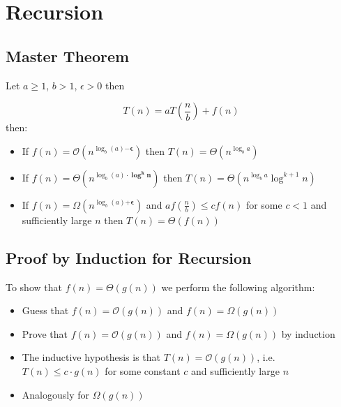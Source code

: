 \section{Recursion}
\subsection{Master Theorem}

Let \( a \geq 1 \), \( b > 1 \), \( \epsilon > 0 \) then

\begin{equation*}
    T(n) = a T \left( \frac{n}{b} \right) + f(n)
\end{equation*}
then:
\begin{itemize}
    \item  If \( f(n) = \mathcal{O} \left( n^{\log_b (a) \bm{ - \epsilon}} \right) \) then \( T(n) = \Theta \left( n^{\log_b a} \right) \)
    \item If \( f(n) = \Theta \left( n^{\log_b (a) \cdot \bm{\log^k n}} \right) \) then \( T(n) = \Theta \left( n^{\log_b a} \log^{k+1} n \right) \)
    \item If \( f(n) = \Omega \left( n^{\log_b (a) 
 \bm{+ \epsilon}} \right) \) and \( a f \left( \frac{n}{b} \right) \leq c f(n) \) for some \( c < 1 \) and sufficiently large \( n \) then \( T(n) = \Theta \left( f \left(n \right) \right) \)
\end{itemize}

\subsection{Proof by Induction for Recursion}
To show that \(f \left( n \right)  = \Theta \left( g \left( n \right) \right) \) we perform the following algorithm: 
\begin{itemize}
    \item Guess that \( f \left( n \right) = \mathcal{O} \left( g \left( n \right) \right) \) and \( f \left( n \right) = \Omega \left( g \left( n \right) \right) \)
    \item Prove that \( f \left( n \right) = \mathcal{O} \left( g \left( n \right) \right) \) and \( f \left( n \right) = \Omega \left( g \left( n \right) \right) \) by induction
    \item The inductive hypothesis is that \( T \left( n \right) = \mathcal{O} \left( g \left( n \right)  \right) \), i.e. \( T \left( n \right) \leq c \cdot g \left( n \right)\)  for some constant \( c \)  and sufficiently large \( n \)
    \item Analogously for \( \Omega \left( g \left( n \right) \right) \)
\end{itemize}

